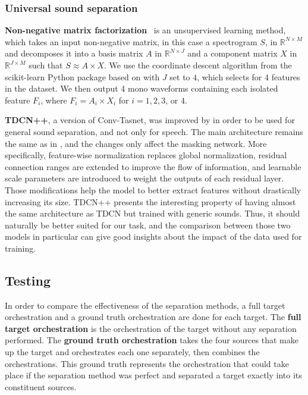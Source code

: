 \documentclass[letterpaper]{article}  %
\begin{document}
      \subsubsection{Universal sound separation}
      \textbf{Non-negative matrix factorization}~\cite{Cichocki_NMF, Fevotte_NMF} is an unsupervised learning method, which takes an input non-negative matrix, in this case a spectrogram $S$, in $\mathbb{R} ^{N\times M}$ and decomposes it into a basis matrix $A$ in $\mathbb{R}^{N\times J}$ and a component matrix $X$ in $\mathbb{R}^{J\times M}$ such that $S\approx A\times X$. We use the coordinate descent algorithm from the scikit-learn Python package based on \cite{Cichocki_NMF} with $J$ set to $4$, which selects for 4 features in the dataset. We then output 4 mono waveforms containing each isolated feature $F_i$, where $F_i=A_i\times X_i$ for $i = 1, 2, 3$, or $4$.

      \textbf{TDCN++}, a version of Conv-Tasnet, was improved by \cite{tdcnpp} in order to be used for general sound separation, and not only for speech. The main architecture remains the same as in \cite{tdcn}, and the changes only affect the masking network. More specifically, feature-wise normalization replaces global normalization, residual connection ranges are extended to improve the flow of information, and learnable scale parameters are introduced to weight the outputs of each residual layer. Those modifications help the model to better extract features without drastically increasing its size.
      TDCN++ presents the interesting property of having almost the same architecture as TDCN but trained with generic sounds. Thus, it should naturally be better suited for our task, and the comparison between those two models in particular can give good insights about the impact of the data used for training.

    \subsection{Testing}\label{subsec:testing}
    In order to compare the effectiveness of the separation methods, a full target orchestration and a ground truth orchestration are done for each target. The \textbf{full target orchestration} is the orchestration of the target without any separation performed. The \textbf{ground truth orchestration} takes the four sources that make up the target and orchestrates each one separately, then combines the orchestrations. This ground truth represents the orchestration that could take place if the separation method was perfect and separated a target exactly into its constituent sources.
\end{document}

